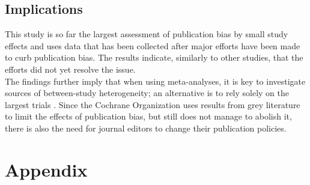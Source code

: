 \documentclass[11pt,a4paper,twoside]{book}\usepackage[]{graphicx}\usepackage[]{color}
\begin{document}
\section{Implications}
This study is so far the largest assessment of publication bias by small study effects and uses data that has been collected after major efforts have been made to curb publication bias. The results indicate, similarly to other studies, that the efforts did not yet resolve the issue. \\
The findings further imply that when using meta-analyses, it is key to investigate sources of between-study heterogeneity; an alternative is to rely solely on the largest trials \citep{largest.study.only}. Since the Cochrane Organization uses results from grey literature to limit the effects of publication bias, but still does not manage to abolish it, there is also the need for journal editors to change their publication policies.




\appendix




\chapter{Appendix}
\end{document}
